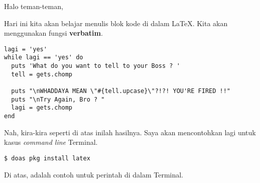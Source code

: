 \documentclass[12pt, times new roman]{article}
\begin{document}
Halo teman-teman,

Hari ini kita akan belajar menulis blok kode di dalam LaTeX. Kita akan menggunakan fungsi \textbf{verbatim}.

\begin{verbatim}
lagi = 'yes'
while lagi == 'yes' do
  puts 'What do you want to tell to your Boss ? '
  tell = gets.chomp

  puts "\nWHADDAYA MEAN \"#{tell.upcase}\"?!?! YOU'RE FIRED !!"
  puts "\nTry Again, Bro ? "
  lagi = gets.chomp
end
\end{verbatim}

Nah, kira-kira seperti di atas inilah hasilnya. Saya akan mencontohkan lagi untuk kasus \textit{command line} Terminal.

\begin{verbatim}
$ doas pkg install latex
\end{verbatim}

Di atas, adalah contoh untuk perintah di dalam Terminal.
\end{document}
